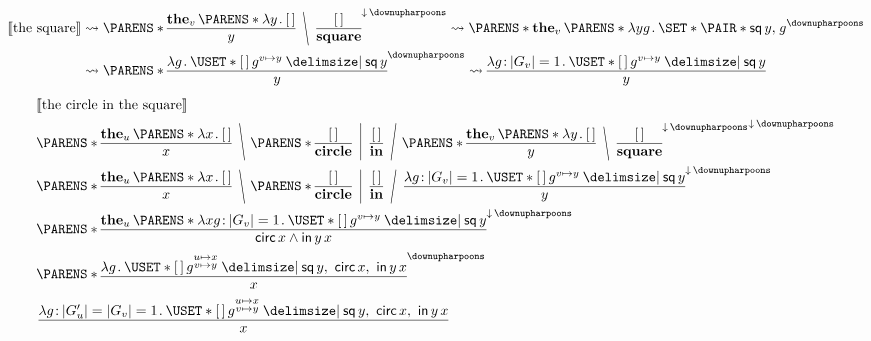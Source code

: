 \documentclass[10pt,fleqn]{article}
\begin{document}
\begin{minipage}[t]{0.5\textwidth} %
\begin{align*} %
  \sv{\textrm{the square}}
  &\leadsto
  \p{%
    \bitt{\textbf{the}_v\,\p{\l y \dt \hole}}{y}
    \BSL{%
    \bitt{\hole}{\textbf{square}}
    }
  }^{\dnar\,\reset}
  \leadsto
  \p{%
    \textbf{the}_v\,\p{\l yg \dt \set{\pair{\cn{sq}\,y}{g}}}
  }^\reset \\
  &\leadsto
  \p{%
    \bitt{\l g \dt \uset{\hole\,g^{v\mapsto y} \giv \cn{sq}\,y}}{y}
  }^\reset
  \leadsto
  \bitt{%
    \l g \col |G_v| = 1 \dt \uset{\hole\,g^{v\mapsto y} \giv \cn{sq}\,y}
  }{y}
\end{align*}
%
\vspace{3em}
%
\begin{align*} %
  &
  \sv{\textrm{the circle in the square}} \\
  &
  \p{%
    \bitt{\textbf{the}_u\,\p{\l x \dt \hole}}{x}
    \BSL{%
    \p{%
      \bitt{\hole}{\textbf{circle}}
      \MSL{%
      \bitt{\hole}{\textbf{in}}
      \FSL{%
      \p{%
        \bitt{\textbf{the}_v\,\p{\l y \dt \hole}}{y}
        \BSL{%
        \bitt{\hole}{\textbf{square}}
        }
      }^{\dnar\,\reset} } }
    } }
  }^{\dnar\,\reset} \\
  &
  \p{%
    \bitt{\textbf{the}_u\,\p{\l x \dt \hole}}{x}
    \BSL{%
    \p{%
      \bitt{\hole}{\textbf{circle}}
      \MSL{%
      \bitt{\hole}{\textbf{in}}
      \FSL{%
      \bitt{%
        \l g \col |G_v| = 1 \dt \uset{\hole\,g^{v\mapsto y} \giv \cn{sq}\,y}
      }{y}
      } }
    } }
  }^{\dnar\,\reset} \\
  &
  \p{%
    \bitt{%
      \textbf{the}_u\,\p{%
        \l xg \col |G_v| = 1 \dt \uset{\hole\,g^{v\mapsto y} \giv \cn{sq}\,y}
      }
    }{%
      \cn{circ}\,x \land \cn{in}\,y\,x
    }
  }^{\dnar\,\reset} \\
  &
  \p{%
    \bitt{%
      \l g \dt
        \uset{%
          \hole\,g^{\substack{u\mapsto x\\ v\mapsto y}}
        \giv
          \cn{sq}\,y,\ \cn{circ}\,x,\ \cn{in}\,y\,x
        }
    }{x}
  }^\reset \\
  &
  \bitt{%
    \l g \col |G'_u| = |G_v| = 1 \dt
      \uset{%
        \hole\,g^{\substack{u\mapsto x\\ v\mapsto y}}
      \giv
        \cn{sq}\,y,\ \cn{circ}\,x,\ \cn{in}\,y\,x
      }
  }{x}
\end{align*}
\end{minipage}
\end{document}
